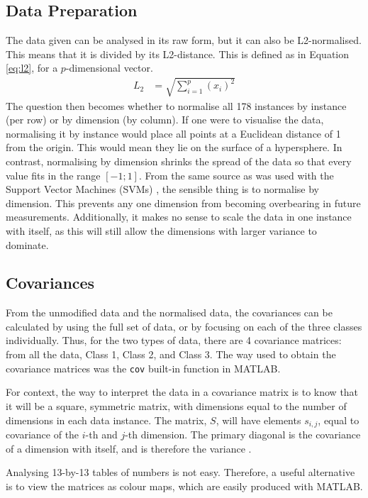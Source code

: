 \documentclass[a4paper, 10pt, conference]{ieeeconf}
\begin{document}
\subsection{Data Preparation}
The data given can be analysed in its raw form, but it can also be L2-normalised. This means that it is divided by its L2-distance. This is defined as in Equation \ref{eq:l2}, for a $p$-dimensional vector.
\begin{align}
  L_2 &= \sqrt{\sum_{i = 1}^{p} \left( x_i \right) ^2 }\label{eq:l2}
\end{align}
The question then becomes whether to normalise all 178 instances by instance (per row) or by dimension (by column). If one were to visualise the data, normalising it by instance would place all points at a Euclidean distance of 1 from the origin. This would mean they lie on the surface of a hypersphere. In contrast, normalising by dimension shrinks the spread of the data so that every value fits in the range $[-1; 1]$. From the same source as was used with the Support Vector Machines (SVMs) \cite{scale}, the sensible thing is to normalise by dimension. This prevents any one dimension from becoming overbearing in future measurements. Additionally, it makes no sense to scale the data in one instance with itself, as this will still allow the dimensions with larger variance to dominate.

\subsection{Covariances}
From the unmodified data and the normalised data, the covariances can be calculated by using the full set of data, or by focusing on each of the three classes individually. Thus, for the two types of data, there are 4 covariance matrices: from all the data, Class 1, Class 2, and Class 3. The way used to obtain the covariance matrices was the \texttt{cov} built-in function in MATLAB.

For context, the way to interpret the data in a covariance matrix is to know that it will be a square, symmetric matrix, with dimensions equal to the number of dimensions in each data instance. The matrix, $S$, will have elements $s_{i, j}$, equal to covariance of the $i$-th and $j$-th dimension. The primary diagonal is the covariance of a dimension with itself, and is therefore the variance \cite{cov}.

Analysing 13-by-13 tables of numbers is not easy. Therefore, a useful alternative is to view the matrices as colour maps, which are easily produced with MATLAB.
\end{document}
